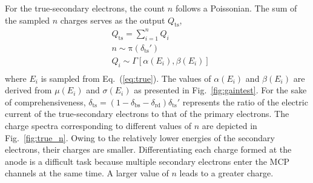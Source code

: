 For the true-secondary electrons, the count $n$ follows a Poissonian. The sum of the sampled $n$ charges serves as the output \(Q_{\mathrm{ts}}\),
\begin{equation}
	\label{eq:ts_all}
	\begin{aligned}
		 & Q_{\mathrm{ts}} = \sum_{i=1}^{n} Q_{i}            \\
		 & n \sim \mathrm{\pi}(\delta_{\mathrm{ts}}')        \\
		 & Q_{i} \sim \varGamma[\alpha(E_{i}), \beta(E_{i})] \\
	\end{aligned}
\end{equation}
where \(E_{i}\) is sampled from Eq.~(\ref{eq:true}).
The values of \(\alpha(E_{i})\) and \(\beta(E_{i})\) are derived from \(\mu(E_{i})\) and \(\sigma(E_{i})\) as presented in Fig.~\ref{fig:gaintest}. For the sake of comprehensiveness, \(\delta_\mathrm{ts} = (1-\delta_{\mathrm{bs}} - \delta_{\mathrm{rd}})\delta_{\mathrm{ts}}'\) represents the ratio of the electric current of the true-secondary electrons to that of the primary electrons. The charge spectra corresponding to different values of \(n\) are depicted in Fig.~\ref{fig:true_n}. Owing to the relatively lower energies of the secondary electrons, their charges are smaller. Differentiating each charge formed at the anode is a difficult task because multiple secondary electrons enter the MCP channels at the same time. A larger value of \(n\) leads to a greater charge.
